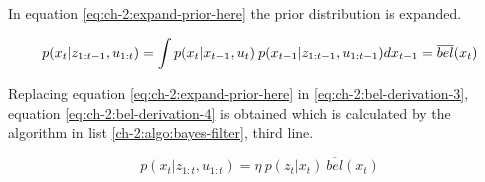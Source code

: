 In equation \ref{eq:ch-2:expand-prior-here} the prior distribution is expanded.

\begin{equation}\label{eq:ch-2:expand-prior-here}
p(x_t | z_{1:t-1}, u_{1:t}) = \int p(x_t | x_{t-1}, u_t) \: p(x_{t-1} | z_{1:t-1}, u_{1:t-1}) dx_{t-1}\\
= \overline{bel}(x_t)
\end{equation}

Replacing equation \ref{eq:ch-2:expand-prior-here} in \ref{eq:ch-2:bel-derivation-3}, equation \ref{eq:ch-2:bel-derivation-4} is obtained which is calculated by the algorithm in list \ref{ch-2:algo:bayes-filter}, third line.

\begin{equation}\label{eq:ch-2:bel-derivation-4}
p(x_t| z_{1:t}, u_{1:t}) = \eta \: p(z_t | x_t) \: \overline{bel}(x_t)
\end{equation}



















